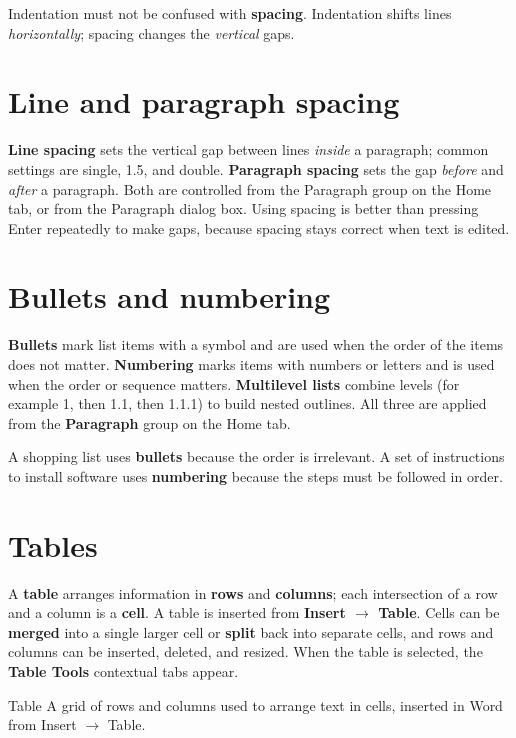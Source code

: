 Indentation must not be confused with \textbf{spacing}. Indentation shifts
lines \emph{horizontally}; spacing changes the \emph{vertical} gaps.

\section{Line and paragraph spacing}
\textbf{Line spacing} sets the vertical gap between lines \emph{inside} a
paragraph; common settings are single, 1.5, and double. \textbf{Paragraph
spacing} sets the gap \emph{before} and \emph{after} a paragraph. Both are
controlled from the Paragraph group on the Home tab, or from the Paragraph
dialog box. Using spacing is better than pressing Enter repeatedly to make
gaps, because spacing stays correct when text is edited.

\section{Bullets and numbering}
\textbf{Bullets} mark list items with a symbol and are used when the order of
the items does not matter. \textbf{Numbering} marks items with numbers or
letters and is used when the order or sequence matters. \textbf{Multilevel
lists} combine levels (for example 1, then 1.1, then 1.1.1) to build nested
outlines. All three are applied from the \textbf{Paragraph} group on the
Home tab.

\begin{example}
A shopping list uses \textbf{bullets} because the order is irrelevant. A set
of instructions to install software uses \textbf{numbering} because the
steps must be followed in order.
\end{example}

\section{Tables}
A \textbf{table} arranges information in \textbf{rows} and \textbf{columns};
each intersection of a row and a column is a \textbf{cell}. A table is
inserted from \textbf{Insert $\rightarrow$ Table}. Cells can be
\textbf{merged} into a single larger cell or \textbf{split} back into
separate cells, and rows and columns can be inserted, deleted, and resized.
When the table is selected, the \textbf{Table Tools} contextual tabs appear.

\begin{definitionbox}{Table}
A grid of rows and columns used to arrange text in cells, inserted in Word
from Insert $\rightarrow$ Table.
\end{definitionbox}

